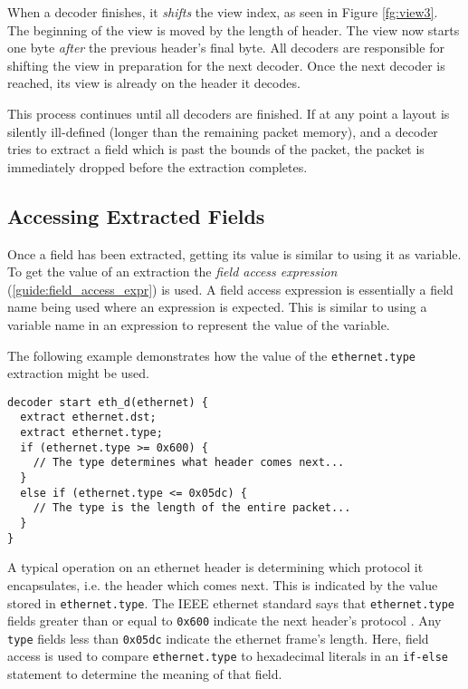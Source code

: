When a decoder finishes, it \textit{shifts} the view index, as seen in Figure
\ref{fg:view3}. The beginning of the view is moved by the length of header.
The view now starts one byte \textit{after} the previous header's final byte. 
All decoders are responsible for shifting the view in
preparation for the next decoder. Once the next decoder is reached, its view is
already on the header it decodes.

This process continues until all decoders are finished.
If at any point a layout is silently ill-defined 
(longer than the remaining packet memory), and a decoder tries
to extract a field which is past the bounds of the packet, the packet
is immediately dropped before the extraction completes.

\subsection{Accessing Extracted Fields} \label{tut:decoder_access}


Once a field has been extracted, getting its value is similar to using
it as variable.
To get the value of an extraction
the \textit{field access expression} (\ref{guide:field_access_expr}) is used.
A field access expression is essentially a field name being used where
an expression is expected. This is similar to using a variable name
in an expression to represent the value of the variable.

The following example demonstrates how the value of the \texttt{ethernet.type} 
extraction might be used.

\begin{codepage}
\begin{lstlisting}
decoder start eth_d(ethernet) {
  extract ethernet.dst;
  extract ethernet.type;
  if (ethernet.type >= 0x600) {
    // The type determines what header comes next...
  }
  else if (ethernet.type <= 0x05dc) {
    // The type is the length of the entire packet...
  }
}
\end{lstlisting}
\end{codepage}

A typical operation on an ethernet header is determining which protocol
it encapsulates, i.e. the header which comes next. This is indicated
by the value stored in \texttt{ethernet.type}.
The IEEE ethernet standard says that \texttt{ethernet.type} fields greater than 
or equal to \texttt{0x600} indicate the next header's protocol \cite{eth_std}. 
Any \texttt{type} fields less than \texttt{0x05dc} indicate the ethernet frame's 
length. 
Here, field access is used to compare \texttt{ethernet.type} to 
hexadecimal literals in an \texttt{if-else} statement to determine the meaning of 
that field.

